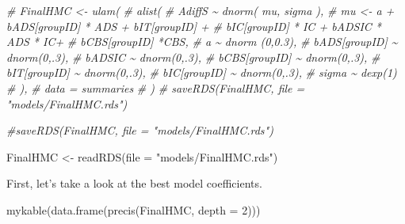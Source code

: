 \documentclass[
  10pt,
  dvipsnames,enabledeprecatedfontcommands]{scrartcl}
\newenvironment{Shaded}{\begin{snugshade}}{\end{snugshade}}
\newcommand{\AttributeTok}[1]{\textcolor[rgb]{0.77,0.63,0.00}{#1}}
\newcommand{\CommentTok}[1]{\textcolor[rgb]{0.56,0.35,0.01}{\textit{#1}}}
\newcommand{\DecValTok}[1]{\textcolor[rgb]{0.00,0.00,0.81}{#1}}
\newcommand{\FunctionTok}[1]{\textcolor[rgb]{0.00,0.00,0.00}{#1}}
\newcommand{\NormalTok}[1]{#1}
\newcommand{\OtherTok}[1]{\textcolor[rgb]{0.56,0.35,0.01}{#1}}
\newcommand{\StringTok}[1]{\textcolor[rgb]{0.31,0.60,0.02}{#1}}
\begin{document}
\begin{Shaded}
\begin{Highlighting}[]
\CommentTok{\# FinalHMC \textless{}{-} ulam(}
\CommentTok{\#   alist(}
\CommentTok{\#     AdiffS \textasciitilde{} dnorm( mu, sigma ),}
\CommentTok{\#     mu \textless{}{-} a + bADS[groupID] * ADS +  bIT[groupID] +}
\CommentTok{\#     bIC[groupID] * IC + bADSIC * ADS * IC+}
\CommentTok{\#     bCBS[groupID] *CBS,}
\CommentTok{\#     a \textasciitilde{} dnorm (0,0.3),}
\CommentTok{\#     bADS[groupID] \textasciitilde{} dnorm(0,.3),}
\CommentTok{\#     bADSIC \textasciitilde{} dnorm(0,.3),}
\CommentTok{\#     bCBS[groupID] \textasciitilde{} dnorm(0,.3),}
\CommentTok{\#     bIT[groupID] \textasciitilde{} dnorm(0,.3),}
\CommentTok{\#     bIC[groupID] \textasciitilde{} dnorm(0,.3),}
\CommentTok{\#     sigma  \textasciitilde{} dexp(1)}
\CommentTok{\#   ),}
\CommentTok{\#   data = summaries}
\CommentTok{\# )}
\CommentTok{\# saveRDS(FinalHMC, file = "models/FinalHMC.rds")}


\CommentTok{\#saveRDS(FinalHMC, file = "models/FinalHMC.rds")}

\NormalTok{FinalHMC }\OtherTok{\textless{}{-}} \FunctionTok{readRDS}\NormalTok{(}\AttributeTok{file =} \StringTok{"models/FinalHMC.rds"}\NormalTok{)}
\end{Highlighting}
\end{Shaded}

\normalsize

First, let's take a look at the best model coefficients.

\vspace{1mm}
\footnotesize

\begin{Shaded}
\begin{Highlighting}[]
\FunctionTok{mykable}\NormalTok{(}\FunctionTok{data.frame}\NormalTok{(}\FunctionTok{precis}\NormalTok{(FinalHMC, }\AttributeTok{depth =} \DecValTok{2}\NormalTok{)))}
\end{Highlighting}
\end{Shaded}
\end{document}
